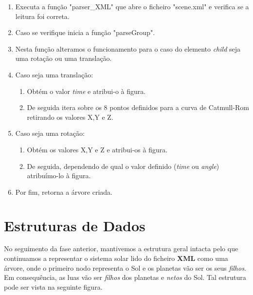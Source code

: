 \documentclass[a4paper]{article}
\begin{document}
\ttfamily
\begin{enumerate}
  \item Executa a função "parser\_XML" que abre o ficheiro "scene.xml" e verifica se a leitura foi correta.
  \item Caso se verifique inicia a função "parseGroup".
  \item Nesta função alteramos o funcionamento para o caso do elemento \textit{child} seja uma rotação ou uma translação.
  \item Caso seja uma translação:
  \begin{enumerate}
    \item Obtém o valor \textit{time} e atribui-o à figura.
    \item De seguida itera sobre os 8 pontos definidos para a curva de Catmull-Rom retirando os valores X,Y e Z.
  \end{enumerate}
  \item Caso seja uma rotação:
  \begin{enumerate}
    \item Obtém os valores X,Y e Z e atribui-os à figura.
    \item De seguida, dependendo de qual o valor definido (\textit{time} ou \textit{angle}) atribuímo-lo à figura.
  \end{enumerate}
  \item Por fim, retorna a árvore criada.
\end{enumerate}
\rmfamily


\newpage

\section{Estruturas de Dados}
\label{sec:estruturasdados}

No seguimento da fase anterior, mantivemos a estrutura geral intacta pelo que continuamos a representar o sistema solar lido do ficheiro \textbf{XML} como uma árvore, onde o primeiro nodo representa o Sol e os planetas vão ser os seus \textit{filhos}. Em consequência, as luas vão ser \textit{filhos} dos planetas e \textit{netos} do Sol. Tal estrutura pode ser vista na seguinte figura.
\end{document}
